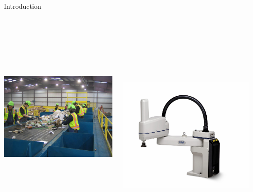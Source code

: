 \documentclass[final]{beamer}
\begin{document}
\begin{frame}{}
{\begin{columns}[t]
\begin{column}{.30\linewidth}
\begin{block}{\centering Introduction}
\begin{columns}[T]
\begin{column}{16cm}{}
	\vspace{0.5cm}
	\centering \includegraphics[height=10cm, width = 12cm]{figures/mrf-recycling-system.jpg}\\
\end{column}
\begin{column}{16cm}{}
	\centering \includegraphics[height=12cm, width = 14cm]{figures/scara.jpg}\\
\end{column}



\end{columns}
\end{block}
\end{column}
\end{columns}}
\end{frame}
\end{document}
